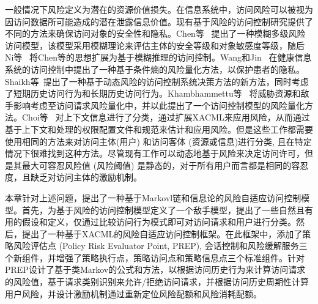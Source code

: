 一般情况下风险定义为潜在的资源价值损失。在信息系统中，访问风险可以被视为因访问数据所可能造成的潜在泄露信息价值。现有基于风险的访问控制研究提供了不同的方法来确保访问对象的安全性和隐私。Chen等~\cite{cheng2007fuzzy} 提出了一种模糊多级风险访问模型，该模型采用模糊理论来评估主体的安全等级和对象敏感度等级，随后Ni等~\cite{ni2010risk} 将Chen等的思想扩展为基于模糊推理的访问控制。Wang和Jin~\cite{wang2011quantified} 在健康信息系统的访问控制中提出了一种基于条件熵的风险量化方法，以保护患者的隐私。Shaikh等~\cite{shaikh2012dynamic}提出了一种基于动态风险的访问控制系统决策方法的新方法，同时考虑了短期历史访问行为和长期历史访问行为。Khambhammettu等~\cite{khambhammettu2013framework} 将威胁资源和敌手影响考虑至访问请求风险量化中，并以此提出了一个访问控制模型的风险量化方法。Choi等~\cite{choi2015framework} 对上下文信息进行了分类，通过扩展XACML来应用风险，从而通过基于上下文和处理的权限配置文件和规范来估计和应用风险。但是这些工作都需要使用相同的方法来对访问主体(用户) 和访问客体 (资源或信息)进行分类, 且在特定情况下很难找到这种方法。尽管现有工作可以动态地基于风险来决定访问许可，但是其最大可容忍风险值 (风险阈值) 是静态的，对于所有用户而言都是相同的容忍度，且缺乏对访问主体的激励机制。

本章针对上述问题，提出了一种基于Markovl链和信息论的风险自适应访问控制模型。首先，为基于风险的访问控制模型定义了一个敌手模型，提出了一些自然且有用的假设和定义，仅通过比较访问行为模式即可对访问请求和用户进行分类。然后，提出了一种基于XACML的风险自适应访问控制框架。在此框架中，添加了策略风险评估点 (Policy Risk Evaluator Point, PREP), 会话控制和风险缓解服务三个新组件，并增强了策略执行点，策略访问点和策略信息点三个标准组件。针对PREP设计了基于类Markov的公式和方法，以根据访问历史行为来计算访问请求的风险值，基于请求类别识别来允许/拒绝访问请求，并根据访问历史周期性计算用户风险，并设计激励机制通过重新定位风险配额和风险消耗配额。

